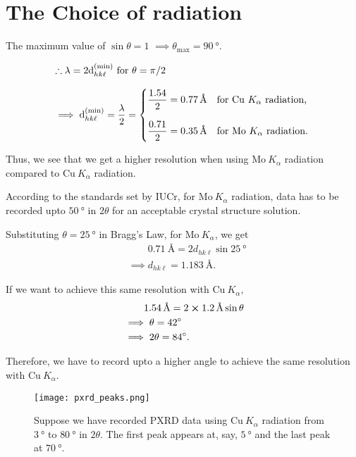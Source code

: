 \section{The Choice of radiation}
	
The maximum value of $\sin \theta = 1$ $\implies \theta_\mathrm{max} = \SI{90}{\degree}.$

\begin{align}
&\therefore \lambda = 2 \d_{hk\ell}^\mathrm{(min)} ~ \mathrm{for} ~ \theta = \pi/2 \nonumber \\[0.8em]
&\implies \d_{hk\ell}^\mathrm{(min)} = \dfrac{\lambda}{2} = \begin{dcases*}
\dfrac{1.54}{2} = \SI{0.77}{\angstrom} & for $\mathrm{Cu}~K_\alpha$ radiation, \\[0.8em]
\dfrac{0.71}{2} = \SI{0.35}{\angstrom} & for $\mathrm{Mo}~K_\alpha$ radiation.
\end{dcases*}
\end{align}

Thus, we see that we get a higher resolution when using $\mathrm{Mo}~K_\alpha$ radiation compared to $\mathrm{Cu}~K_\alpha$ radiation.

According to the standards set by IUCr, for $\mathrm{Mo}~K_\alpha$ radiation, data has to be recorded  upto $\SI{50}{\degree}$ in $2\theta$ for an acceptable crystal structure solution.

Substituting $\theta = \SI{25}{\degree}$ in Bragg's Law, for $\mathrm{Mo}~K_\alpha$, we get%
%
\begin{align}
&\phantom{\implies} \SI{0.71}{\angstrom} = 2 d_{hk\ell} \sin \SI{25}{\degree} \nonumber \\
&\implies d_{hk\ell} = \SI{1.183}{\angstrom}.
\end{align}

If we want to achieve this same resolution with $\mathrm{Cu}~K_\alpha,$%
%
\begin{align}
&\phantom{\implies} \SI{1.54}{\angstrom} = 2 \cross \SI{1.2}{\angstrom} \sin \theta \nonumber \\
&\implies \theta = \SI{42}{\degree} \nonumber \\
&\implies 2\theta = \SI{84}{\degree}.
\end{align}

Therefore, we have to record upto a higher angle to achieve the same resolution with $\mathrm{Cu}~K_\alpha.$

\begin{figure}
	\centering
	\texttt{[image: pxrd\_peaks.png]}
	\caption{\label{fig:pxrd_peaks}Suppose we have recorded PXRD data using $\mathrm{Cu}~K_\alpha$ radiation from $\SI{3}{\degree}$ to $\SI{80}{\degree}$ in $2\theta$. The first peak appears at, say, $\SI{5}{\degree}$ and the last peak at $\SI{70}{\degree}.$}
\end{figure}

